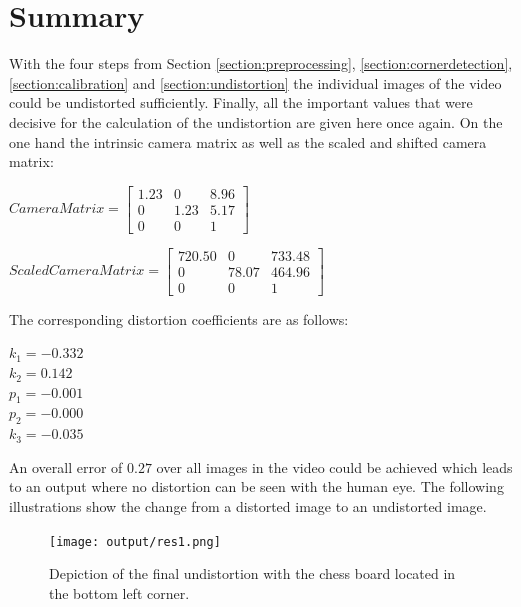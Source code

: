 \documentclass[twocolumn,10pt]{asme2ej}
\begin{document}
\section{Summary}
\label{section:summary}
\noindent
With the four steps from Section \ref{section:preprocessing},
\ref{section:cornerdetection},\ref{section:calibration} and 
\ref{section:undistortion} the individual images of the video could 
be undistorted sufficiently.
\noindent
Finally, all the important values that were decisive for the calculation of the undistortion are given here once again.
On the one hand the intrinsic camera matrix as well as the scaled and shifted camera matrix: 

\begin{center}
    $Camera Matrix = \begin{bmatrix}
        1.23 & 0 & 8.96 \\
   0 & 1.23& 5.17 \\
   0 & 0 & 1
   \end{bmatrix}
   $
    \label{eq_intrinsicmatrix}
\end{center}

\begin{center}
    $Scaled Camera Matrix = \begin{bmatrix}
        720.50 & 0 & 733.48 \\
   0 & 78.07 & 464.96 \\
   0 & 0 & 1
   \end{bmatrix}
   $
    \label{final_intrinsic}
\end{center}
The corresponding distortion coefficients are as follows:
\begin{center}
    $k_1 = -0.332$\\
    $k_2 =  0.142$\\
    $p_1 = -0.001$\\
    $p_2 = -0.000$\\
    $k_3 = -0.035$\\
    \label{eq_distcoeff}
\end{center}
\noindent
An overall error of $0.27$ over all images in the video could be 
achieved which leads to an output where no distortion can be seen with the human eye.
The following illustrations show the change from a distorted image to an undistorted image.
\begin{figure}[H]
\centerline{\texttt{[image: output/res1.png]}}
\caption{Depiction of the final undistortion with the chess board located in the bottom left corner.}
\label{fig:res1}
\end{figure}
\end{document}
